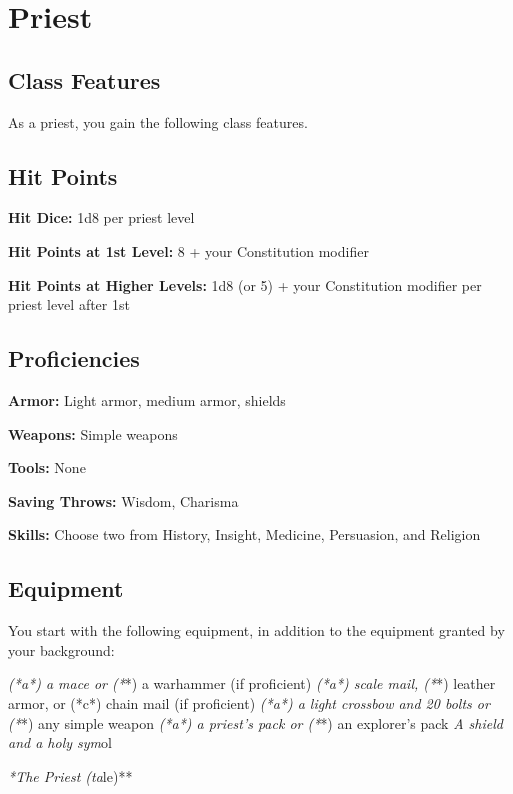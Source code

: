 \section{Priest}

\subsection{Class Features}

As a priest, you gain the following class features.

\subsection{Hit Points}

\textbf{Hit Dice:} 1d8 per priest level

\textbf{Hit Points at 1st Level:} 8 + your Constitution modifier

\textbf{Hit Points at Higher Levels:} 1d8 (or 5) + your Constitution modifier per priest level after 1st

\subsection{Proficiencies}

\textbf{Armor:} Light armor, medium armor, shields

\textbf{Weapons:} Simple weapons

\textbf{Tools:} None

\textbf{Saving Throws:} Wisdom, Charisma

\textbf{Skills:} Choose two from History, Insight, Medicine, Persuasion, and Religion

\subsection{Equipment}

You start with the following equipment, in addition to the equipment granted by your background:

\textit{ (*a*) a mace or (*}*) a warhammer (if proficient)
\textit{ (*a*) scale mail, (*}*) leather armor, or (*c*) chain mail (if proficient)
\textit{ (*a*) a light crossbow and 20 bolts or (*}*) any simple weapon
\textit{ (*a*) a priest’s pack or (*}*) an explorer’s pack
\textit{ A shield and a holy sym}ol

\textit{*The Priest (ta}le)**

